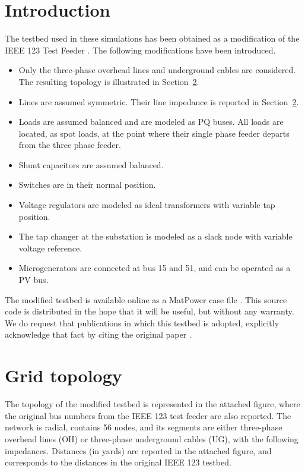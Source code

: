 \documentclass[10pt,letterpaper]{article}
\begin{document}
\section{Introduction}
\label{sec:intro}

The testbed used in these simulations has been obtained as a modification of the IEEE 123 Test Feeder \cite{Kersting2001,ieeetestfeeders}.
The following modifications have been introduced.
\begin{itemize}
\item Only the three-phase overhead lines and underground cables are considered. The resulting topology is illustrated in Section~\ref{sec:topology}.
\item Lines are assumed symmetric. Their line impedance is reported in Section~\ref{sec:topology}. 
\item Loads are assumed balanced and are modeled as PQ buses. All loads are located, as spot loads, at the point where their single phase feeder departs from the three phase feeder.
\item Shunt capacitors are assumed balanced.
\item Switches are in their normal position.
\item Voltage regulators are modeled as ideal transformers with variable tap position.
\item The tap changer at the substation is modeled as a slack node with variable voltage reference.
\item Microgenerators are connected at bus 15 and 51, and can be operated as a PV bus.
\end{itemize}

The modified testbed is available online as a MatPower case file \cite{github_approx-pf}.
This source code is distributed in the hope that it will be useful, but without any warranty. We do request that publications in which this testbed is adopted, explicitly acknowledge that fact by citing the original paper \cite{Bolognani_powerflow}.

\section{Grid topology}
\label{sec:topology}

The topology of the modified testbed is represented in the attached figure, where the original bus numbers from the IEEE 123 test feeder are also reported.
The network is radial, contains 56 nodes, and its segments are either three-phase overhead lines (OH) or three-phase underground cables (UG), with the following impedances. Distances (in yards) are reported in the attached figure, and corresponds to the distances in the original IEEE 123 testbed.
\end{document}

